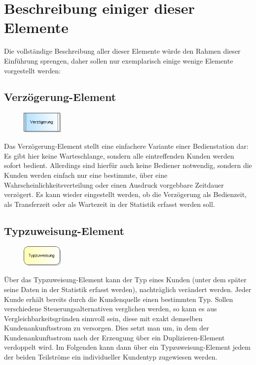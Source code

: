 \documentclass[deutsch]{svmono}
\begin{document}
\section{Beschreibung einiger dieser Elemente}

Die vollständige Beschreibung aller dieser Elemente würde den Rahmen dieser Einführung sprengen, daher sollen nur exemplarisch einige wenige Elemente vorgestellt werden:

\subsection*{Verzögerung-Element}

\begin{figure}
\vspace{-22pt}
\includegraphics[width=2cm]{IconDelay.png}
\vspace{-22pt}
\end{figure}
Das Verzögerung-Element stellt eine einfachere Variante einer Bedienstation dar: Es gibt hier keine Warteschlange, sondern alle eintreffenden Kunden werden sofort bedient. Allerdings sind hierfür auch keine Bediener notwendig, sondern die Kunden werden einfach nur eine bestimmte, über eine Wahrscheinlichkeitsverteilung oder einen Ausdruck vorgebbare Zeitdauer verzögert. Es kann wieder eingestellt werden, ob die Verzögerung als Bedienzeit, als Transferzeit oder als Wartezeit in der Statistik erfasst werden soll.

\subsection*{Typzuweisung-Element}

\begin{figure}
\vspace{-22pt}
\includegraphics[width=2cm]{IconAssign.png}
\vspace{-22pt}
\end{figure}
Über das Typzuweisung-Element kann der Typ eines Kunden (unter dem später seine Daten in der Statistik erfasst werden), nachträglich verändert werden. Jeder Kunde erhält bereits durch die Kundenquelle einen bestimmten Typ. Sollen verschiedene Steuerungsalternativen verglichen werden, so kann es aus Vergleichbarkeitsgründen sinnvoll sein, diese mit exakt demselben Kundenankunftsstrom zu versorgen. Dies setzt man um, in dem der Kundenankunftsstrom nach der Erzeugung über ein Duplizieren-Element verdoppelt wird. Im Folgenden kann dann über ein Typzuweisung-Element jedem der beiden Teilströme ein individueller Kundentyp zugewiesen werden.
\end{document}
